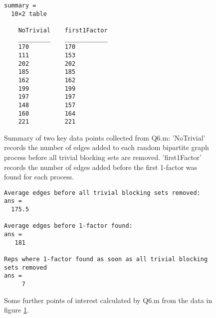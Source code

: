 \documentclass[a4paper]{article}
\begin{document}
\begin{figure}[H]
    \centering
    \begin{verbatim}
summary =
  10×2 table
  
    NoTrivial    first1Factor
    _________    ____________
    170          170         
    111          153         
    202          202         
    185          185         
    162          162         
    199          199         
    197          197         
    148          157         
    160          164         
    221          221        
    \end{verbatim}
    \caption{Summary of two key data points collected from Q6.m: 'NoTrivial' records the number of edges added to each random bipartite graph process before all trivial blocking sets are removed. 'first1Factor' records the number of edges added before the first 1-factor was found for each process.}
    \label{fig:q6summary}
\end{figure}

\begin{figure}[H]
    \centering
    \begin{verbatim}
Average edges before all trivial blocking sets removed:
ans =
  175.5

Average edges before 1-factor found:
ans =
   181

Reps where 1-factor found as soon as all trivial blocking sets removed
ans =
     7
    \end{verbatim}
    \caption{Some further points of interest calculated by Q6.m from the data in figure \ref{fig:q6summary}.}
    \label{fig:q6output}
\end{figure}

\end{document}
